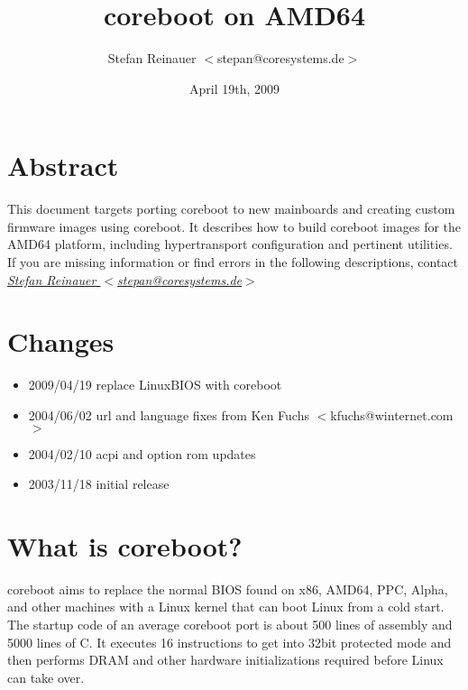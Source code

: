 \documentclass[titlepage,12pt]{article}
\title{coreboot on AMD64}
\author{Stefan Reinauer $<$stepan@coresystems.de$>$}
\date{April 19th, 2009}
\begin{document}
\maketitle

\thispagestyle{empty}                                                           

\tableofcontents

\newpage

%
%

\section{Abstract}

This document targets porting coreboot to new mainboards and creating
custom firmware images using coreboot. It describes how to build
coreboot images for the AMD64 platform, including hypertransport
configuration and pertinent utilities. If you are missing information or
find errors in the following descriptions, contact
\href{mailto:stepan@coresystems.de}{\textit{Stefan Reinauer $<$stepan@coresystems.de$>$}}


%
%

\section{Changes}
 \begin{itemize}
 \item 2009/04/19 replace LinuxBIOS with coreboot
 \item 2004/06/02 url and language fixes from Ken Fuchs $<$kfuchs@winternet.com$>$
 \item 2004/02/10 acpi and option rom updates
 \item 2003/11/18 initial release 
 \end{itemize}



%
%

\section{What is coreboot?}

coreboot aims to replace the normal BIOS found on x86, AMD64, PPC, 
Alpha, and other machines with a Linux kernel that can boot Linux from a cold
start. The startup code of an average coreboot port is about 500 lines of
assembly and 5000 lines of C. It executes 16 instructions to get into 32bit
protected mode and then performs DRAM and other hardware initializations
required before Linux can take over.
\end{document}
